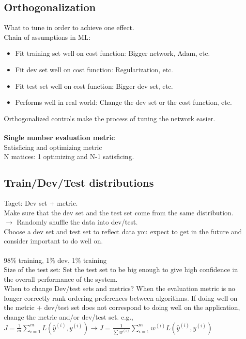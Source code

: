 \subsection{Orthogonalization}
What to tune in order to achieve one effect.\\
Chain of assumptions in ML:
\begin{itemize}
\item[]
Fit training set well on cost function: Bigger network, Adam, etc.
\item[]
Fit dev set well on cost function: Regularization, etc.
\item[]
Fit test set well on cost function: Bigger dev set, etc.
\item[]
Performs well in real world: Change the dev set or the cost function, etc.
\end{itemize}
Orthogonalized controls make the process of tuning the network easier.\\
\\
\textbf{Single number evaluation metric}\\
Satisficing and optimizing metric\\
N matices: 1 optimizing and N-1 satisficing.\\

%
\subsection{Train/Dev/Test distributions}
Taget: Dev set + metric.\\
Make sure that the dev set and the test set come from the same distribution.\\
$\rightarrow$ Randomly shuffle the data into dev/test.\\
Choose a dev set and test set to reflect data you expect to get in the future and consider important to do well on.\\
\\
98\% training, 1\% dev,  1\% training\\
Size of the test set: Set the test set to be big enough to give high confidence in the overall performance of the system.\\
When to change Dev/test sets and metrics? When the evaluation metric is no longer correctly rank ordering preferences between algorithms. If doing well on the metric + dev/test set does not correspond to doing well on the application, change the metric and/or dev/test set. e.g., $J = \frac{1}{m}\sum_{i = 1}^mL(\hat{y}^{(i)}, y^{(i)}) \rightarrow J = \frac{1}{\sum w^{(i)}}\sum_{i = 1}^m w^{(i)} L(\hat{y}^{(i)}, y^{(i)})$

